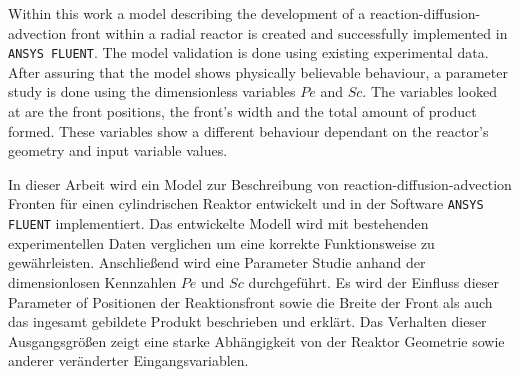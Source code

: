 \documentclass[../thesis.tex]{subfiles}
\begin{document}
\label{chp:abstract}

Within this work a model describing the development of a reaction-diffusion-advection front within a radial reactor is created and successfully implemented in \texttt{ANSYS FLUENT}. The model validation is done using existing experimental data. After assuring that the model shows physically believable behaviour, a parameter study is done using the dimensionless variables $Pe$ and $Sc$. The variables looked at are the front positions, the front's width and the total amount of product formed. These variables show a different behaviour dependant on the reactor's geometry and input variable values.
\newline

In dieser Arbeit wird ein Model zur Beschreibung von reaction-diffusion-advection Fronten für einen cylindrischen Reaktor entwickelt und in der Software \texttt{ANSYS FLUENT} implementiert. Das entwickelte Modell wird mit bestehenden experimentellen Daten verglichen um eine korrekte Funktionsweise zu gewährleisten. Anschließend wird eine Parameter Studie anhand der dimensionlosen Kennzahlen $Pe$ und $Sc$ durchgeführt. Es wird der Einfluss dieser Parameter of Positionen der Reaktionsfront sowie die Breite der Front als auch das ingesamt gebildete Produkt beschrieben und erklärt. Das Verhalten dieser Ausgangsgrößen zeigt eine starke Abhängigkeit von der Reaktor Geometrie sowie anderer veränderter Eingangsvariablen.
\end{document}
